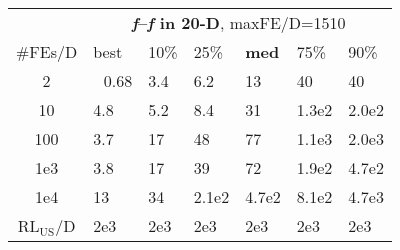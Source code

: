 \begin{tabular}{c|llllll}
 & \multicolumn{6}{|c}{\textbf{\textit{f}\raisebox{-0.35ex}{1}--\textit{f}\raisebox{-0.35ex}{24} in 20-D}, maxFE/D=1510}\\
\#FEs/D & best & 10\% & 25\% & \textbf{med} & 75\% & 90\%\\
2 & ~\,0.68 & \hspace*{1ex}3.4 & \hspace*{1ex}6.2 & 13 & 40 & 40\\
10 & \hspace*{1ex}4.8 & \hspace*{1ex}5.2 & \hspace*{1ex}8.4 & 31 & 1.3e2 & 2.0e2\\
100 & \hspace*{1ex}3.7 & 17 & 48 & 77 & 1.1e3 & 2.0e3\\
1e3 & \hspace*{1ex}3.8 & 17 & 39 & 72 & 1.9e2 & 4.7e2\\
1e4 & 13 & 34 & 2.1e2 & 4.7e2 & 8.1e2 & 4.7e3\\
$\text{RL}_{\text{US}}$/D & 2e3 & 2e3 & 2e3 & 2e3 & 2e3 & 2e3
\end{tabular}
